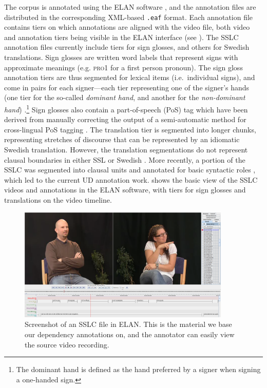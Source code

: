 \documentclass[11pt]{article}
\begin{document}
The corpus is annotated using the ELAN software \cite{Wittenburg2006elan}, and the annotation files are distributed in the corresponding XML-based \texttt{.eaf} format. Each annotation file contains tiers on which annotations are aligned with the video file, both video and annotation tiers being visible in the ELAN interface (see ). The SSLC annotation files currently include tiers for sign glosses, and others for Swedish translations. Sign glosses are written word labels that represent signs with approximate meanings (e.g. \textsc{pro1} for a first person pronoun). The sign gloss annotation tiers are thus segmented for lexical items (i.e.~individual signs), and come in pairs for each signer---each tier representing one of the signer's hands (one tier for the so-called \textit{dominant hand}, and another for the \textit{non-dominant hand}) \cite{Mesch2015gloss}.\footnote{The dominant hand is defined as the hand preferred by a signer when signing a one-handed sign.} Sign glosses also contain a part-of-speech (PoS) tag which have been derived from manually correcting the output of a semi-automatic method for cross-lingual PoS tagging \cite{Ostling2015enriching}. The translation tier is segmented into longer chunks, representing stretches of discourse that can be represented by an idiomatic Swedish translation. However, the translation segmentations do not represent clausal boundaries in either SSL or Swedish \cite{Borstell2014segmenting}. More recently, a portion of the SSLC was segmented into clausal units and annotated for basic syntactic roles \cite{Borstell2016syntactic}, which led to the current UD annotation work.  shows the basic view of the SSLC videos and annotations in the ELAN software, with tiers for sign glosses and translations on the video timeline.

\begin{figure}[p]
	\centering
	\includegraphics[width=0.9\textwidth]{sslc_elan.png}
	\caption{Screenshot of an SSLC file in ELAN. This is the material we base
    our dependency annotations on, and the annotator can easily view the
    source video recording.}
	\label{fig:sslc_elan}
\end{figure}
\end{document}
